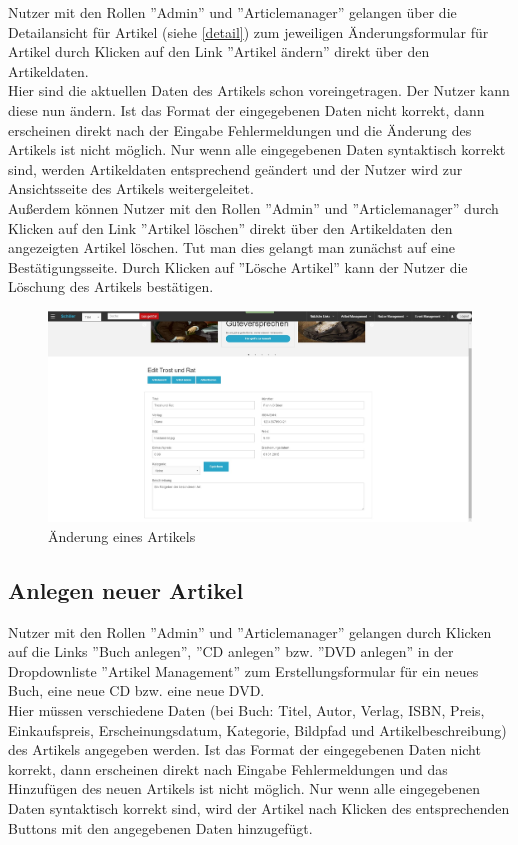 \documentclass[a4paper]{article}
\begin{document}
Nutzer mit den Rollen ''Admin'' und ''Articlemanager'' gelangen über die Detailansicht für Artikel (siehe \ref{detail}) zum jeweiligen Änderungsformular für Artikel durch Klicken auf den Link ''Artikel ändern'' direkt über den Artikeldaten. \\
Hier sind die aktuellen Daten des Artikels schon voreingetragen. Der Nutzer kann diese nun ändern. Ist das Format der eingegebenen Daten nicht korrekt, dann erscheinen direkt nach der Eingabe Fehlermeldungen und die Änderung des Artikels ist nicht möglich. Nur wenn alle eingegebenen Daten syntaktisch korrekt sind, werden Artikeldaten entsprechend geändert und der Nutzer wird zur Ansichtsseite des Artikels weitergeleitet. \\
Außerdem können Nutzer mit den Rollen ''Admin'' und ''Articlemanager'' durch Klicken auf den Link ''Artikel löschen'' direkt über den Artikeldaten den angezeigten Artikel löschen. Tut man dies gelangt man zunächst auf eine Bestätigungsseite. Durch Klicken auf ''Lösche Artikel'' kann der Nutzer die Löschung des Artikels bestätigen.

\begin{figure}[ht]
\centering
\includegraphics[width=1.0\textwidth]{Artikelaenderung.jpg}
\caption{Änderung eines Artikels}
\end{figure}
\smallskip

\FloatBarrier

\subsection{Anlegen neuer Artikel}

Nutzer mit den Rollen ''Admin'' und ''Articlemanager'' gelangen durch Klicken auf die Links ''Buch anlegen'', ''CD anlegen'' bzw. ''DVD anlegen'' in der Dropdownliste ''Artikel Management'' zum Erstellungsformular für ein neues Buch, eine neue CD bzw. eine neue DVD. \\
Hier müssen verschiedene Daten (bei Buch: Titel, Autor, Verlag, ISBN, Preis, Einkaufspreis, Erscheinungsdatum, Kategorie, Bildpfad und Artikelbeschreibung) des Artikels angegeben werden. Ist das Format der eingegebenen Daten nicht korrekt, dann erscheinen direkt nach Eingabe Fehlermeldungen und das Hinzufügen des neuen Artikels ist nicht möglich. Nur wenn alle eingegebenen Daten syntaktisch korrekt sind, wird der Artikel nach Klicken des entsprechenden Buttons mit den angegebenen Daten hinzugefügt.
\end{document}
